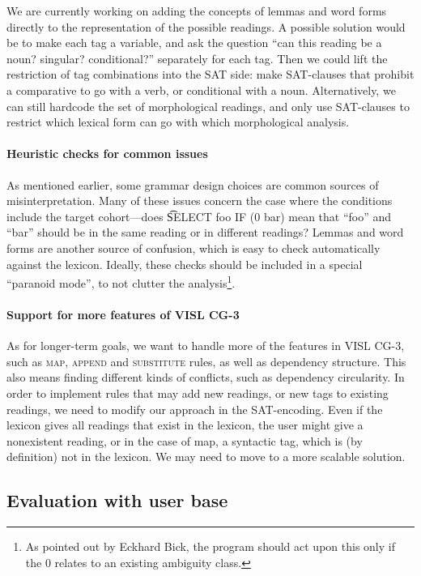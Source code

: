 {{We are currently working on adding the concepts of lemmas and word
forms directly to the representation of the possible readings.
A possible solution would be to make each tag a variable, and ask the
question ``can this reading be a noun? singular? 
conditional?'' separately for each tag. Then we could lift the
restriction of tag combinations into the SAT side: make SAT-clauses
that prohibit a comparative to go with a verb, or conditional with a noun.
Alternatively, we can still hardcode the set of morphological readings, and 
only use SAT-clauses to restrict which lexical form can go with which morphological analysis.

\paragraph{Heuristic checks for common issues} 
As mentioned earlier, some grammar design choices  
are common sources of misinterpretation.
Many of these issues concern the case where the conditions include 
the target cohort---does \t{SELECT foo IF (0 bar)} mean that ``foo'' and ``bar'' 
should be in the same reading or in different readings? 
Lemmas and word forms are another source of confusion, which is easy to check automatically against the lexicon. 
Ideally, these checks should be included in a special ``paranoid mode'', to not clutter the analysis\footnote{As pointed out by Eckhard Bick, the program should act upon this only if the 0 relates to an existing ambiguity class.}.


\paragraph{Support for more features of VISL CG-3}
As for longer-term goals, we want to handle more of the features in VISL CG-3,
such as \textsc{map}, \textsc{append} and
\textsc{substitute} rules, as well as dependency structure. 
This also means finding different kinds of conflicts, such as dependency circularity.
In order to implement rules that may add new readings, or new tags to
existing readings, we need to modify our approach in the SAT-encoding.
Even if the lexicon gives all readings that exist in the lexicon, the
user might give a nonexistent reading, or in the case of {\sc map}, a
syntactic tag, which is (by definition) not in the lexicon. We may need to move
to a more scalable solution.

\subsection{Evaluation with user base}

}}
